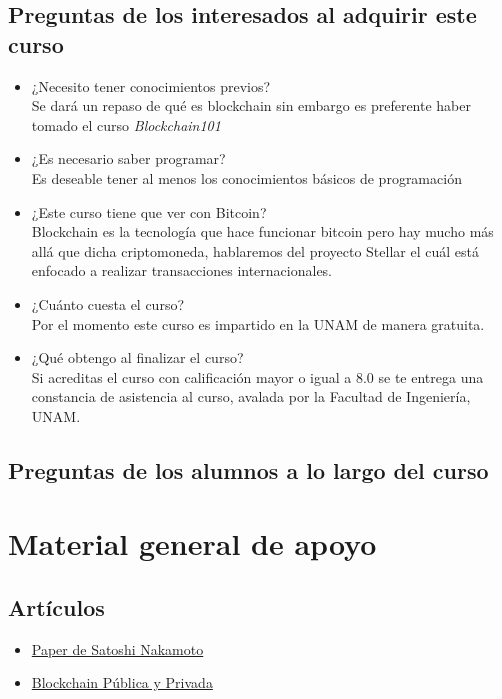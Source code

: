\documentclass[a4paper,12pt]{/home/armando/Documentos/Cursos/LaTeX/Plantillas/lib/pub}
\begin{document}
	\subsection{Preguntas de los interesados al adquirir este curso}
	\begin{itemize}
		\item ¿Necesito tener conocimientos previos?\\Se dará un repaso de qué es blockchain sin embargo es preferente haber tomado el curso \textit{Blockchain101}
		\item ¿Es necesario saber programar?\\Es deseable tener al menos los conocimientos básicos de programación 
		\item ¿Este curso tiene que ver con Bitcoin?\\Blockchain es la tecnología que hace funcionar bitcoin pero hay mucho más allá que dicha criptomoneda, hablaremos del proyecto Stellar el cuál está enfocado a realizar transacciones internacionales.
		\item ¿Cuánto cuesta el curso?\\Por el momento este curso es impartido en la UNAM de manera gratuita.
		\item ¿Qué obtengo al finalizar el curso?\\Si acreditas el curso con calificación mayor o igual a 8.0 se te entrega una constancia de asistencia al curso, avalada por la Facultad de Ingeniería, UNAM.
	\end{itemize}
	\subsection{Preguntas de los alumnos a lo largo del curso}

\section{Material general de apoyo}
	\subsection{Artículos}
	\begin{itemize}
		\item \href{https://bitcoin.org/files/bitcoin-paper/bitcoin\_es\_latam.pdf}{Paper de Satoshi Nakamoto}
		\item \href{https://medium.com/@marvin.soto/blockchain-público-vs-blockchain-privado-cuál-es-la-diferencia-8115be4a593b}{Blockchain Pública y Privada}
		
	\end{itemize}
\end{document}
